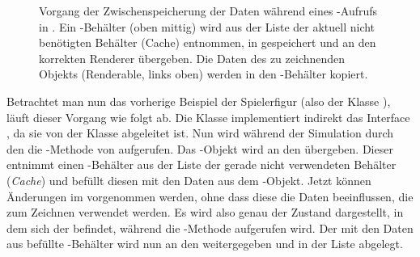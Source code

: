 \begin{figure}
	\centering
		\caption[Vorgang der Zwischenspeicherung der Daten während eines -Aufrufs in \classMasterRenderer{}.]{Vorgang der Zwischenspeicherung der Daten während eines -Aufrufs in \classMasterRenderer{}. Ein \classRenderedRenderable{}-Behälter (oben mittig) wird aus der Liste der aktuell nicht benötigten Behälter (Cache) entnommen, in  gespeichert und an den korrekten Renderer übergeben. Die Daten des zu zeichnenden Objekts (Renderable, links oben) werden in den \classRenderedRenderable{}-Behälter kopiert.}\label{fig:copyRenderable}
\end{figure}


\begin{example}
	Betrachtet man nun das vorherige Beispiel der Spielerfigur (also der Klasse \classPlayer{}), läuft dieser Vorgang wie folgt ab. Die Klasse \classPlayer{} implementiert indirekt das Interface \classRenderable{}, da sie von der Klasse \classEntity{} abgeleitet ist. Nun wird während der Simulation durch den \classEntityManager{} die -Methode von \classPlayer{} aufgerufen. Das \classPlayer{}-Objekt wird an den \classMasterRenderer{} übergeben. Dieser entnimmt einen \classRenderedRenderable{}-Behälter aus der Liste der gerade nicht verwendeten Behälter (\emph{Cache}) und befüllt diesen mit den Daten aus dem \classPlayer{}-Objekt. Jetzt können Änderungen im \classPlayer{} vorgenommen werden, ohne dass diese die Daten beeinflussen, die zum Zeichnen verwendet werden. Es wird also genau der Zustand dargestellt, in dem sich der \classPlayer{} befindet, während die -Methode aufgerufen wird. Der mit den Daten aus \classPlayer{} befüllte \classRenderedRenderable{}-Behälter wird nun an den \classOpaqueMasterRenderer{} weitergegeben und in der Liste  abgelegt.
\end{example}

